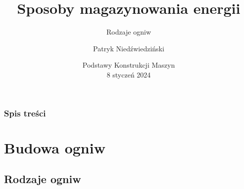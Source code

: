 \documentclass[
	11pt, %
]{beamer}
\title[Akumulatory]{Sposoby magazynowania energii} %
\subtitle{Rodzaje ogniw} %
\author[P. Niedźwiedziński]{Patryk Niedźwiedziński}
\institute[PUT]{Politechnika Poznańska \\ \smallskip Wydział Inżynierii Środowiska i Energetyki}
\date[08.01.2024]{Podstawy Konstrukcji Maszyn \\ 8 styczeń 2024}
\begin{document}

\begin{frame}
	\titlepage %
\end{frame}



\begin{frame}
	\frametitle{Spis treści} %
	
	\tableofcontents %
\end{frame}


\section{Budowa ogniw}

\subsection{Rodzaje ogniw}
\end{document}
